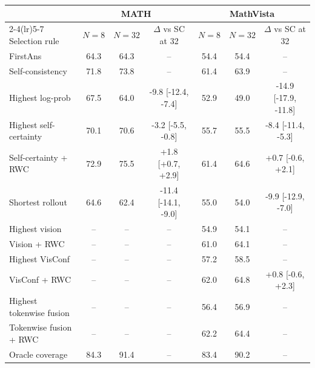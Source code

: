 \begin{tabular}{lcccccc}\toprule & \multicolumn{3}{c}{MATH} & \multicolumn{3}{c}{MathVista} \\\cmidrule(lr){2-4}\cmidrule(lr){5-7} Selection rule & $N{=}8$ & $N{=}32$ & $\Delta$ vs SC at 32 & $N{=}8$ & $N{=}32$ & $\Delta$ vs SC at 32 \\ \midrule
FirstAns & 64.3 & 64.3 & -- & 54.4 & 54.4 & -- \\
Self-consistency & 71.8 & 73.8 & -- & 61.4 & 63.9 & -- \\
Highest log-prob & 67.5 & 64.0 & -9.8 [-12.4, -7.4] & 52.9 & 49.0 & -14.9 [-17.9, -11.8] \\
Highest self-certainty & 70.1 & 70.6 & -3.2 [-5.5, -0.8] & 55.7 & 55.5 & -8.4 [-11.4, -5.3] \\
Self-certainty + RWC & 72.9 & 75.5 & +1.8 [+0.7, +2.9] & 61.4 & 64.6 & +0.7 [-0.6, +2.1] \\
Shortest rollout & 64.6 & 62.4 & -11.4 [-14.1, -9.0] & 55.0 & 54.0 & -9.9 [-12.9, -7.0] \\
Highest vision & -- & -- & -- & 54.9 & 54.1 & -- \\
Vision + RWC & -- & -- & -- & 61.0 & 64.1 & -- \\
Highest VisConf & -- & -- & -- & 57.2 & 58.5 & -- \\
VisConf + RWC & -- & -- & -- & 62.0 & 64.8 & +0.8 [-0.6, +2.3] \\
Highest tokenwise fusion & -- & -- & -- & 56.4 & 56.9 & -- \\
Tokenwise fusion + RWC & -- & -- & -- & 62.2 & 64.4 & -- \\
\midrule Oracle coverage & 84.3 & 91.4 & -- & 83.4 & 90.2 & -- \\
\bottomrule\end{tabular}
